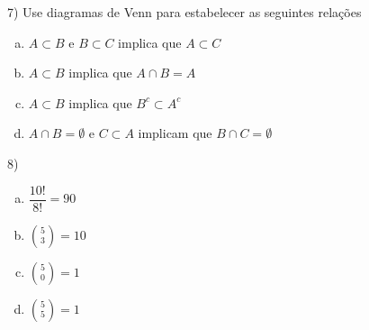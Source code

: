 \documentclass{article}
\begin{document}
7) Use diagramas de Venn para estabelecer as seguintes relações

\begin{enumerate}[a)] %
    \item $A \subset B$ e $B \subset C$ implica que $A \subset C$
    \item $A \subset B$ implica que $A\cap B = A$
    \item $A \subset B$ implica que $B^c \subset A^c$
    \item $A \cap B = \emptyset $ e $ C \subset A$ implicam que $B \cap C = \emptyset$ 
\end{enumerate}

8) 
\begin{enumerate}[a)]
    \item $\dfrac{10!}{8!} = 90$
    \item $\binom{5}{3} = 10$
    \item $\binom{5}{0} = 1$
    \item $\binom{5}{5} = 1$
\end{enumerate}
\end{document}
